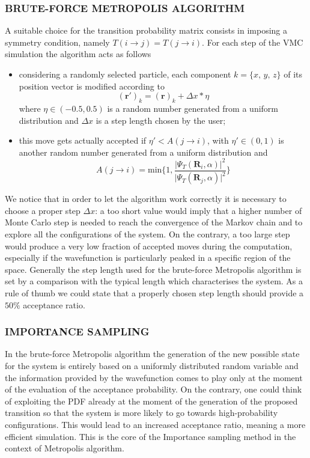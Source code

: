 \subsubsection{BRUTE-FORCE METROPOLIS ALGORITHM}
A suitable choice for the transition probability matrix consists in imposing a symmetry condition, namely $T( i\rightarrow j) = T(j \rightarrow i)$. For each step of the VMC simulation the algorithm acts as follows
\begin{itemize}
    \item considering a randomly selected particle, each  component $k = \{x,\,y,\,z\}$ of its position vector is modified according to
    \begin{equation*}
        (\bm{r}')_k = (\bm{r})_k + \Delta x \ast \eta
    \end{equation*}
    where $\eta \in (-0.5, 0.5)$ is a random number generated from a uniform distribution and $\Delta x$ is a step length chosen by the user;
    \item this move gets actually accepted if $\eta' < A(j\rightarrow i)$, with $\eta' \in (0,1)$ is another random number generated from a uniform distribution and
    \begin{equation*}
        A(j \rightarrow i) = \text{min} \bigg\{ 1, \frac{\vert \Psi_T(\bm{R}_i, \alpha) \vert^2 }{\vert \Psi_T(\bm{R}_j, \alpha) \vert^2 } \bigg\}
    \end{equation*}
\end{itemize}
We notice that in order to let the algorithm work correctly it is necessary to choose a proper step $\Delta x$: a too short value would imply that a higher number of Monte Carlo step is needed to reach the convergence of the Markov chain and to explore all the configurations of the system. On the contrary, a too large step would produce a very low fraction of accepted moves during the computation, especially if the wavefunction is particularly peaked in a specific region of the space. Generally the step length used for the brute-force Metropolis algorithm \cite{metropolis} is set by a comparison with the typical length which characterises the system. As a rule of thumb we could state that a properly chosen step length should provide a $50\%$ acceptance ratio. 




\subsubsection{IMPORTANCE SAMPLING}
In the brute-force Metropolis algorithm the generation of the new possible state for the system is entirely based on a uniformly distributed random variable and the information provided by the wavefunction comes to play only at the moment of the evaluation of the acceptance probability. On the contrary, one could think of exploiting the PDF already at the moment of the generation of the proposed transition so that the system is more likely to go towards high-probability configurations. This would lead to an increased acceptance ratio, meaning a more efficient simulation. This is the core of the Importance sampling method \cite{hastings} in the context of Metropolis algorithm.

